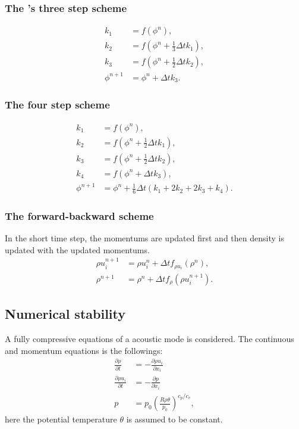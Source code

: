 \subsubsection{The \citet{Wicker_Skamarock_2002}'s three step scheme}

\begin{align}
  k_1 &= f(\phi^n), \\
  k_2 &= f\left(\phi^n + \frac{1}{3}\Delta t k_1\right), \\
  k_3 &= f\left(\phi^n + \frac{1}{2}\Delta t k_2\right), \\
  \phi^{n+1} &= \phi^n + \Delta t k_3.
\end{align}


\subsubsection{The four step scheme}

\begin{align}
  k_1 &= f(\phi^n), \\
  k_2 &= f\left(\phi^n + \frac{1}{2}\Delta t k_1\right), \\
  k_3 &= f\left(\phi^n + \frac{1}{2}\Delta t k_2\right), \\
  k_4 &= f\left(\phi^n + \Delta t k_3\right), \\
  \phi^{n+1} &= \phi^n + \frac{1}{6}\Delta t (k_1 + 2k_2 + 2k_3 + k_4).
\end{align}


\subsubsection{The forward-backward scheme}
In the short time step, the momentums are updated first and then density is updated with the updated momentums.
\begin{align}
  \rho u^{n+1}_i &= \rho u^n_i + \Delta t f_{\rho u_i}(\rho^n), \\
  \rho^{n+1}     &= \rho^n + \Delta t f_{\rho}(\rho u^{n+1}_i).
\end{align}

\subsection{Numerical stability}

A fully compressive equations of a acoustic mode is considered.
The continuous and momentum equations is the followings:
\begin{align}
  \frac{\partial \rho}{\partial t} &=
  - \frac{\partial \rho u_i}{\partial x_i} \\
  \frac{\partial \rho u_i}{\partial t} &=
  - \frac{\partial p}{\partial x_i} \\
  p &= p_0 \left( \frac{R \rho \theta}{p_0} \right)^{c_p/c_v},
\end{align}
here the potential temperature $\theta$ is assumed to be constant.

